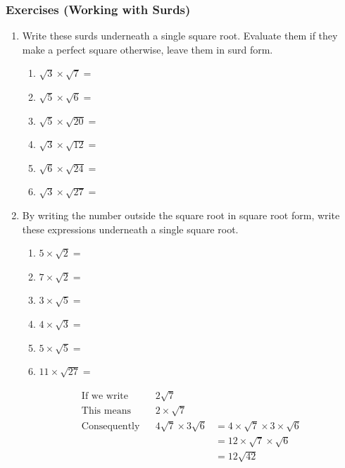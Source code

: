 \documentclass[a4paper,12pt]{article}
\begin{document}
\subsubsection{Exercises (Working with Surds)}
\begin{enumerate}
	\item Write these surds underneath a single square root. Evaluate them if they make a perfect square otherwise, leave them in surd form.
	\begin{multicols}{2}
		\begin{enumerate}
			\item $\displaystyle \sqrt{3}\times \sqrt{7}= $
			\item $\displaystyle \sqrt{5}\times \sqrt{6}= $
			\item $\displaystyle \sqrt{5}\times \sqrt{20}=$
			\item $\displaystyle \sqrt{3}\times \sqrt{12}=$
			\item $\displaystyle \sqrt{6}\times \sqrt{24}=$
			\item $\displaystyle \sqrt{3}\times \sqrt{27}=$		
		\end{enumerate}
	\end{multicols}
	\item By writing the number outside the square root in square root form, write these expressions underneath a single square root.
	\begin{multicols}{2}
		\begin{enumerate}
			\item $\displaystyle 5\times \sqrt{2}= $
			\item $\displaystyle 7\times \sqrt{2}= $
			\item $\displaystyle 3\times \sqrt{5}=$
			\item $\displaystyle 4\times \sqrt{3}=$
			\item $\displaystyle 5\times \sqrt{5}=$
			\item $\displaystyle 11\times \sqrt{27}=$		
		\end{enumerate}
	\end{multicols}
	\begin{align*}
	\text{If we write}&& 2\sqrt{7}&\\
	\text{This means}&& 2\times \sqrt{7}&\\
	\text{Consequently}&& 4\sqrt{7}\times 3\sqrt{6}&=4\times \sqrt{7}\times 3\times \sqrt{6}\\
	&&&=12\times \sqrt{7} \times \sqrt{6}\\
	&&&=12\sqrt{42}
	\end{align*}

\end{enumerate}
\end{document}
